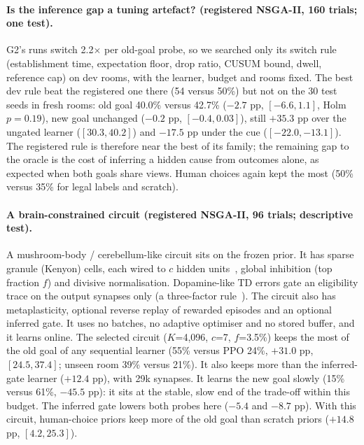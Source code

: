 \documentclass[10pt,onecolumn,letterpaper]{article}
\begin{document}
\paragraph{Is the inference gap a tuning artefact? (registered NSGA-II, 160 trials; one test).} G2's runs switch
2.2$\times$ per old-goal probe, so we searched only its switch rule (establishment time, expectation floor, drop ratio,
CUSUM bound, dwell, reference cap) on dev rooms, with the learner, budget and rooms fixed. The best dev rule beat the
registered one there (54 versus 50\%) but not on the 30 test seeds in fresh rooms: old goal 40.0\% versus 42.7\%
($-2.7$ pp, $[-6.6,1.1]$, Holm $p=0.19$), new goal unchanged ($-0.2$ pp, $[-0.4,0.03]$), still $+35.3$ pp over the
ungated learner ($[30.3,40.2]$) and $-17.5$ pp under the cue ($[-22.0,-13.1]$). The registered rule is therefore near the
best of its family; the remaining gap to the oracle is the cost of inferring a hidden cause from outcomes alone, as
expected when both goals share views. Human choices again kept the most (50\% versus 35\% for legal labels and scratch).

\paragraph{A brain-constrained circuit (registered NSGA-II, 96 trials; descriptive test).} A mushroom-body /
cerebellum-like circuit sits on the frozen prior. It has sparse granule (Kenyon) cells, each wired to $c$ hidden
units~\cite{litwinkumar2017}, global inhibition (top fraction $f$) and divisive normalisation. Dopamine-like TD errors
gate an eligibility trace on the output synapses only (a three-factor rule~\cite{fremaux2016neuromodulated}). The circuit
also has metaplasticity, optional reverse replay of rewarded episodes and an optional inferred gate. It uses no batches,
no adaptive optimiser and no stored buffer, and it learns online. The selected circuit ($K$=4,096, $c$=7, $f$=3.5\%) keeps the
most of the old goal of any sequential learner (55\% versus PPO 24\%, $+31.0$ pp, $[24.5,37.4]$; unseen room 39\% versus
21\%). It also keeps more than the inferred-gate learner ($+12.4$ pp), with 29k synapses. It learns the new goal slowly
(15\% versus 61\%, $-45.5$ pp): it sits at the stable, slow end of the trade-off within this budget. The inferred gate
lowers both probes here ($-5.4$ and $-8.7$ pp). With this circuit, human-choice priors keep more of the old goal than
scratch priors ($+14.8$ pp, $[4.2,25.3]$).
\end{document}
